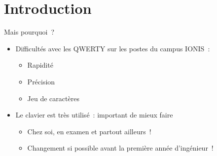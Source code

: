 \section{Introduction}

\begin{frame}{Mais pourquoi~?}
  \begin{itemize}
    \item Difficultés avec les QWERTY sur les postes du campus IONIS~: \pause
      \begin{itemize}
        \item Rapidité \pause
        \item Précision \pause
        \item Jeu de caractères \pause
      \end{itemize}

    \item Le clavier est très utilisé~: important de mieux faire \pause
      \begin{itemize}
        \item Chez soi, en examen et partout ailleurs~! \pause
        \item Changement si possible avant la première année d’ingénieur~!
      \end{itemize}
  \end{itemize}
\end{frame}
